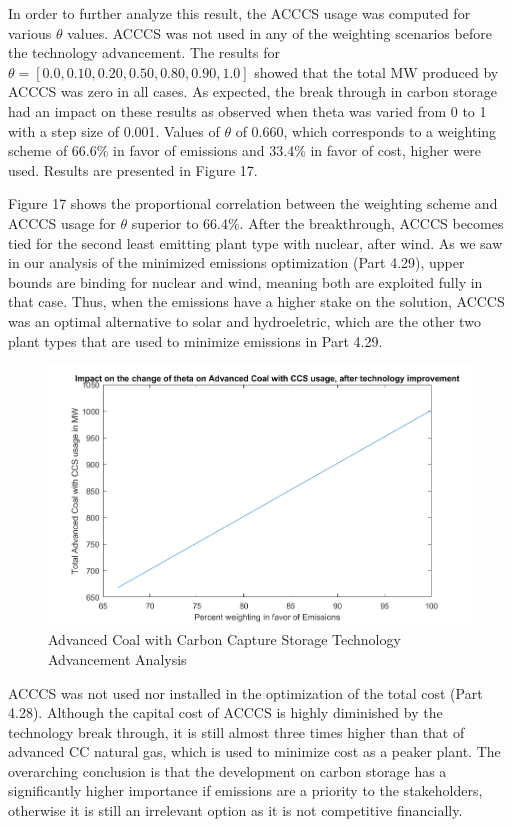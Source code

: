 \documentclass{article}
\begin{document}
	In order to further analyze this result, the ACCCS usage was computed for various $\theta$ values. ACCCS was not used in any of the weighting scenarios before the technology advancement. The results for $\theta = [0.0, 0.10, 0.20, 0.50, 0.80, 0.90, 1.0]$ showed that the total MW produced by ACCCS was zero in all cases. As expected, the break through in carbon storage had an impact on these results as observed when theta was varied from 0 to 1 with a step size of 0.001. Values of $\theta$ of 0.660, which corresponds to a weighting scheme of 66.6\% in favor of emissions and 33.4\% in favor of cost, higher were used. Results are presented in Figure 17.

	 
	Figure 17 shows the proportional correlation between the weighting scheme and ACCCS usage for $\theta$ superior to 66.4\%. After the breakthrough, ACCCS becomes tied for the second least emitting plant type with nuclear, after wind. As we saw in our analysis of the minimized emissions optimization (Part 4.29), upper bounds are binding for nuclear and wind, meaning both are exploited fully in that case. Thus, when the emissions have a higher stake on the solution, ACCCS was an optimal alternative to solar and hydroeletric, which are the other two plant types that are used to minimize emissions in Part 4.29. 
	
		\begin{figure}[H]
			\includegraphics[width=\textwidth]{438_17_CCSvsTheta}
			\caption{Advanced Coal with Carbon Capture Storage Technology Advancement Analysis}
	\end{figure} 

	ACCCS was not used nor installed in the optimization of the total cost (Part 4.28). Although the capital cost of ACCCS is highly diminished by the technology break through, it is still almost three times higher than that of advanced CC natural gas, which is used to minimize cost as a peaker plant. The overarching conclusion is that the development on carbon storage has a significantly higher importance if emissions are a priority to the stakeholders, otherwise it is still an irrelevant option as it is not competitive financially.
	
\end{document}
